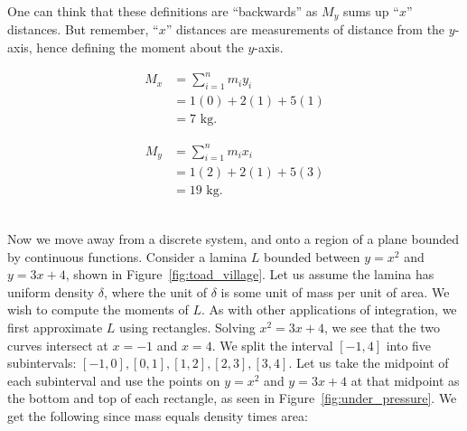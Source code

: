 One can think that these definitions are ``backwards'' as $M_y$ sums up ``$x$'' distances. But remember, ``$x$'' distances are measurements of distance from the $y$-axis, hence defining the moment about the $y$-axis.\\

{\noindent\begin{minipage}{.4\linewidth}
\begin{align*}
M_x &=  \sum_{i=1}^n m_iy_i \\
		&= 1(0) + 2(1) + 5(1) \\
		&= 7 \text{ kg}.
\end{align*}
\end{minipage}
\begin{minipage}{.4\linewidth}
\begin{align*}
M_y &=  \sum_{i=1}^n m_ix_i \\
		&= 1(2) + 2(1) + 5(3) \\
		&= 19 \text{ kg}.
\end{align*}
\end{minipage}
\begin{minipage}{.2\linewidth}
\end{minipage}
}\\

Now we move away from a discrete system, and onto a region of a plane bounded by continuous functions.
Consider a lamina $L$ bounded between $y=x^2$ and $y=3x+4$, shown in Figure~\ref{fig:toad_village}.
Let us assume the lamina has uniform density $\delta$, where the unit of $\delta$ is some unit of mass per unit of area.
We wish to compute the moments of $L$.
As with other applications of integration, we first approximate $L$ using rectangles.  Solving $x^2=3x+4$, we see that the two curves intersect at $x=-1$ and $x=4$.  We split the interval $[-1,4]$ into five subintervals: $[-1,0], [0,1], [1,2], [2,3], [3,4]$.
Let us take the midpoint of each subinterval and use the points on $y=x^2$ and $y=3x+4$ at that midpoint as the bottom and top of each rectangle, as seen in Figure~\ref{fig:under_pressure}.  We get the following since mass equals density times area:


